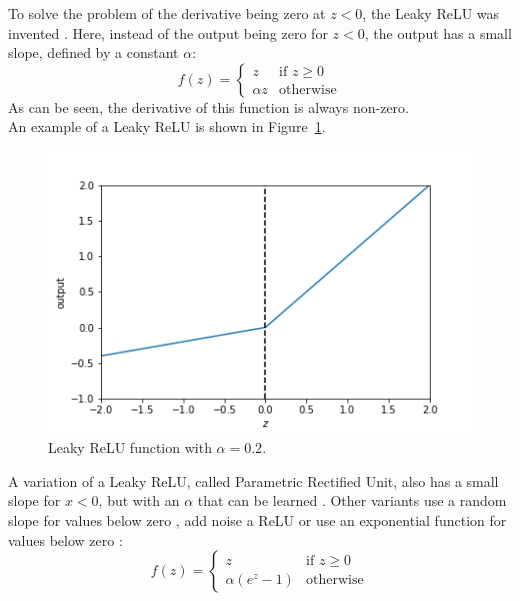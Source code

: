 To solve the problem of the derivative being zero at $z<0$, the Leaky ReLU was invented \citep{maas2013rectifier}. Here, instead of the output being zero for $z<0$, the output has a small slope, defined by a constant $\alpha$:
\begin{equation}
    f(z) = \begin{cases}
        z & \text{if $z \ge 0$}\\
        \alpha z & \text{otherwise}
        \end{cases}
\end{equation}
As can be seen, the derivative of this function is always non-zero.\\
An example of a Leaky ReLU is shown in Figure~\ref{fig:lrelu}.\\
\begin{figure}[htb]
    \centering
    \includegraphics[width=.8\linewidth]{images/activation_functions/lrelu.png}
    \caption[Leaky ReLU function]{Leaky ReLU function with $\alpha = 0.2$.}
    \label{fig:lrelu}
\end{figure}

A variation of a Leaky ReLU, called Parametric Rectified Unit, also has a small slope for $x<0$, but with an $\alpha$ that can be learned \citep{journals/corr/HeZR015}. Other variants use a random slope for values below zero \citep{journals/corr/XuWCL15}, add noise a ReLU \citep{conf/icml/NairH10} or use an exponential function for values below zero \citep{journals/corr/ClevertUH15}:
\begin{equation}
    f(z) = \begin{cases}
        z & \text{if $z \ge 0$}\\
        \alpha (e^z-1) & \text{otherwise}
        \end{cases}
\end{equation}

